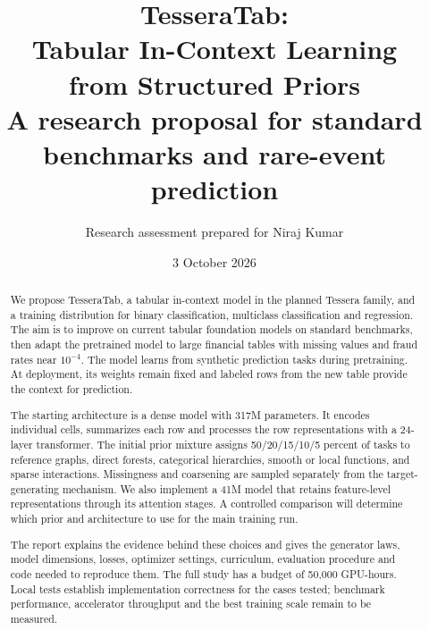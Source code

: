 \documentclass[11pt]{article}
\title{TesseraTab:\protect\\Tabular In-Context Learning\protect\\from Structured Priors\protect\\[6pt]\large A research proposal for standard benchmarks and rare-event prediction}
\author{Research assessment prepared for Niraj Kumar}
\date{3 October 2026}
\begin{document}
\maketitle
\thispagestyle{empty}

\begin{abstract}
\noindent We propose TesseraTab, a tabular in-context model in the planned Tessera family, and a training distribution for binary classification, multiclass classification and regression. The aim is to improve on current tabular foundation models on standard benchmarks, then adapt the pretrained model to large financial tables with missing values and fraud rates near $10^{-4}$. The model learns from synthetic prediction tasks during pretraining. At deployment, its weights remain fixed and labeled rows from the new table provide the context for prediction.

The starting architecture is a dense model with 317M parameters. It encodes individual cells, summarizes each row and processes the row representations with a 24-layer transformer. The initial prior mixture assigns 50/20/15/10/5 percent of tasks to reference graphs, direct forests, categorical hierarchies, smooth or local functions, and sparse interactions. Missingness and coarsening are sampled separately from the target-generating mechanism. We also implement a 41M model that retains feature-level representations through its attention stages. A controlled comparison will determine which prior and architecture to use for the main training run.

The report explains the evidence behind these choices and gives the generator laws, model dimensions, losses, optimizer settings, curriculum, evaluation procedure and code needed to reproduce them. The full study has a budget of 50,000 GPU-hours. Local tests establish implementation correctness for the cases tested; benchmark performance, accelerator throughput and the best training scale remain to be measured.
\end{abstract}

\begin{center}
\end{center}
\clearpage
{\small\setlength{\parskip}{0pt}\setlength{\baselineskip}{11pt}\tableofcontents}
\clearpage
\end{document}
